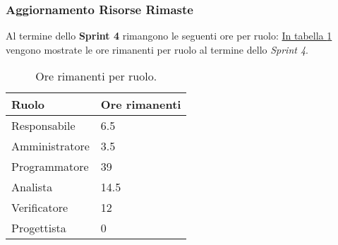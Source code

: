 \subsubsection{Aggiornamento Risorse Rimaste}
\label{sec:AggiornamentoRisorse_Sprint4}
Al termine dello \textbf{Sprint 4} rimangono le seguenti ore per ruolo: \hyperref[tab:sprint4_ore_rimanenti]{In tabella \ref{tab:sprint4_ore_rimanenti}} vengono mostrate le ore rimanenti per ruolo al termine dello \textit{Sprint 4}.

\begin{table}[H]
    \centering
    \begin{tabular}{| l | l |}
    \hline
    \textbf{Ruolo} & 
    \textbf{Ore rimanenti}\\
    \hline
        Responsabile & 6.5 \\
    \hline
        Amministratore & 3.5 \\
    \hline
        Programmatore & 39\\
    \hline
        Analista & 14.5\\
    \hline
        Verificatore & 12\\
    \hline
        Progettista & 0\\
    \hline
    \end{tabular}
    \caption{Ore rimanenti per ruolo.}
    \label{tab:sprint4_ore_rimanenti} 
\end{table}